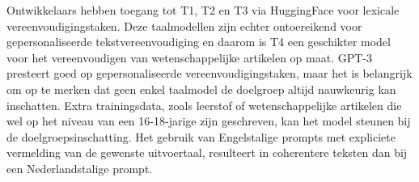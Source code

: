 \medspace


Ontwikkelaars hebben toegang tot T1, T2 en T3 via HuggingFace voor lexicale vereenvoudigingstaken. Deze taalmodellen zijn echter ontoereikend voor gepersonaliseerde tekstvereenvoudiging en daarom is T4 een geschikter model voor het vereenvoudigen van wetenschappelijke artikelen op maat. GPT-3 presteert goed op gepersonaliseerde vereenvoudigingstaken, maar het is belangrijk om op te merken dat geen enkel taalmodel de doelgroep altijd nauwkeurig kan inschatten. Extra trainingsdata, zoals leerstof of wetenschappelijke artikelen die wel op het niveau van een 16-18-jarige zijn geschreven, kan het model steunen bij de doelgroepsinschatting. Het gebruik van Engelstalige prompts met expliciete vermelding van de gewenste uitvoertaal, resulteert in coherentere teksten dan bij een Nederlandstalige prompt.